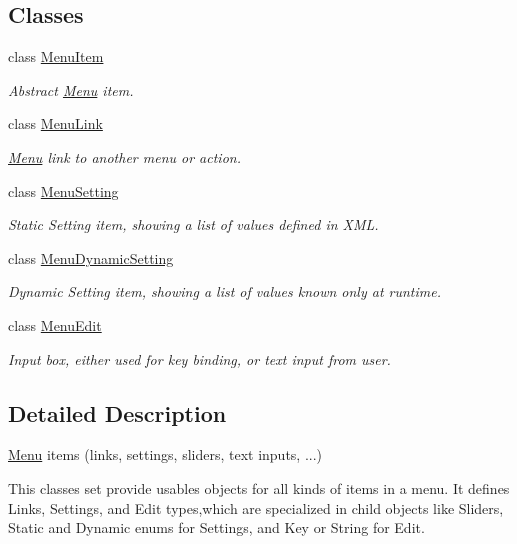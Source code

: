 \subsection*{Classes}
\begin{DoxyCompactItemize}
\item 
class \hyperlink{classMenuItem}{Menu\+Item}
\begin{DoxyCompactList}\small\item\em Abstract \hyperlink{classMenu}{Menu} item. \end{DoxyCompactList}\item 
class \hyperlink{classMenuLink}{Menu\+Link}
\begin{DoxyCompactList}\small\item\em \hyperlink{classMenu}{Menu} link to another menu or action. \end{DoxyCompactList}\item 
class \hyperlink{classMenuSetting}{Menu\+Setting}
\begin{DoxyCompactList}\small\item\em Static Setting item, showing a list of values defined in X\+ML. \end{DoxyCompactList}\item 
class \hyperlink{classMenuDynamicSetting}{Menu\+Dynamic\+Setting}
\begin{DoxyCompactList}\small\item\em Dynamic Setting item, showing a list of values known only at runtime. \end{DoxyCompactList}\item 
class \hyperlink{classMenuEdit}{Menu\+Edit}
\begin{DoxyCompactList}\small\item\em Input box, either used for key binding, or text input from user. \end{DoxyCompactList}\end{DoxyCompactItemize}


\subsection{Detailed Description}
\hyperlink{classMenu}{Menu} items (links, settings, sliders, text inputs, ...) 

This classes set provide usables objects for all kinds of items in a menu. It defines Links, Settings, and Edit types,which are specialized in child objects like Sliders, Static and Dynamic enums for Settings, and Key or String for Edit. 